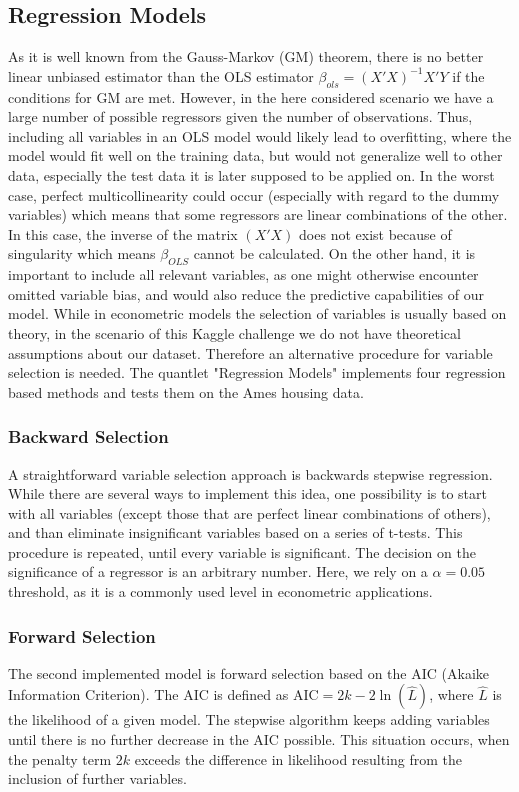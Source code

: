 \subsection{Regression Models} \label{sec:reg_theory}
As it is well known from the Gauss-Markov (GM) theorem, there is no better linear unbiased estimator than the OLS estimator $\beta_{ols} = (X'X)^{-1}X'Y$  if the conditions for GM are met. However, in the here considered scenario we have a large number of possible regressors given the number of observations. Thus, including all variables in an OLS model would likely lead to overfitting, where the model would fit well on the training data, but would not generalize well to other data, especially the test data it is later supposed to be applied on. In the worst case, perfect multicollinearity could occur (especially with regard to the dummy variables)  which means that some regressors are linear combinations of the other. In this case, the inverse of the matrix $(X'X)$ does not exist  because of singularity which means $\beta_{OLS}$ cannot be calculated.  
On the other hand, it is important to include all relevant variables, as one  might otherwise encounter omitted variable bias, and would also reduce the predictive capabilities of our model. 
While in econometric models  the selection of variables is usually based on theory, in the scenario of this Kaggle challenge we do not have theoretical assumptions about our dataset. Therefore an alternative procedure for variable selection is needed. The quantlet "Regression Models"  implements four regression based methods and tests them on the Ames housing data. 

\subsubsection{Backward Selection}
A straightforward variable selection approach is backwards stepwise regression. While there are several ways to implement this idea, one possibility is to  start with all variables (except those that are perfect linear combinations of others), and than eliminate insignificant variables based on a series of  t-tests. This procedure is repeated, until every variable is significant. The decision on the significance of a regressor is an arbitrary number. Here, we rely on a $\alpha = 0.05$ threshold, as it is a commonly used level in econometric applications. 

\subsubsection{Forward Selection}
The second implemented model is forward selection based on the AIC (Akaike Information Criterion). The AIC is defined as 
${\displaystyle \mathrm{AIC}=2k-2\ln({\hat{L}})}$, where $\hat{L}$ is the likelihood of a given model. The stepwise algorithm keeps adding variables until there is no further decrease in the AIC possible. This situation occurs, when the penalty term $2k$ exceeds the difference in likelihood resulting from the inclusion of further variables. 

